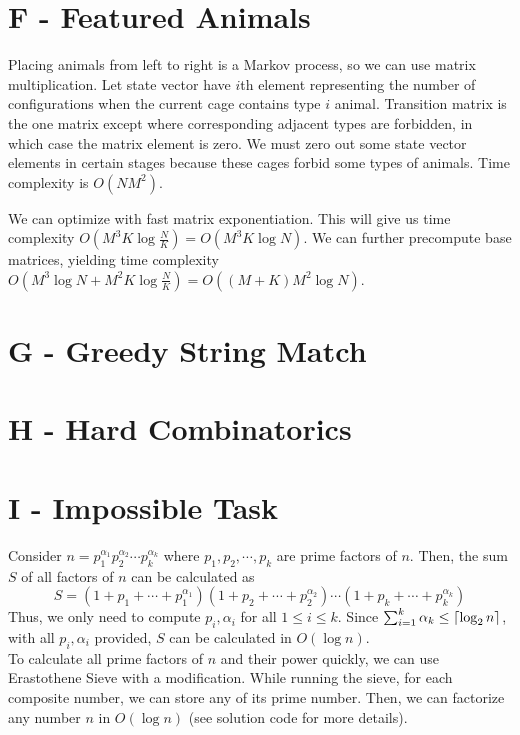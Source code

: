 \documentclass{article}
\DeclarePairedDelimiter\ceil{\lceil}{\rceil}
\begin{document}
\section*{F - Featured Animals}

Placing animals from left to right is a Markov process, so we can use matrix multiplication. Let state vector have $i$th element representing the number of configurations when the current cage contains type $i$ animal. Transition matrix is the one matrix except where corresponding adjacent types are forbidden, in which case the matrix element is zero. We must zero out some state vector elements in certain stages because these cages forbid some types of animals. Time complexity is $O(N M^2)$. 

We can optimize with fast matrix exponentiation. This will give us time complexity $O(M^3 K \log{\frac{N}{K}}) = O(M^3 K \log{N})$. We can further precompute base matrices, yielding time complexity $O(M^3 \log{N} + M^2 K \log{\frac{N}{K}}) = O((M+K) M^2 \log{N})$. 

\section*{G - Greedy String Match}



\section*{H - Hard Combinatorics}



\section*{I - Impossible Task}
Consider $n = p_1^{\alpha_1}p_2^{\alpha_2}\cdots p_k^{\alpha_k}$ where $p_1, p_2, \cdots, p_k$ are prime factors of $n$.
Then, the sum $S$ of all factors of $n$ can be calculated as
\begin{equation}
S = \left(1 + p_1 + \cdots + p_1^{\alpha_1}\right)\left(1 + p_2 + \cdots + p_2^{\alpha_2}\right)\cdots\left(1 + p_k + \cdots + p_k^{\alpha_k}\right)
\end{equation}
Thus, we only need to compute $p_i, \alpha_i$ for all $1 \leq i \leq k$. Since $\sum_{i = 1}^k \alpha_k \leq \ceil{\log_2{n}}$, with
all $p_i, \alpha_i$ provided, $S$ can be calculated in $O(\log{n})$.\\

\noindent To calculate all prime factors of $n$ and their power quickly, we can use Erastothene Sieve with a modification. While
running the sieve, for each composite number, we can store any of its prime number. Then, we can factorize any number $n$ in
$O(\log{n})$ (see solution code for more details).
\end{document}
